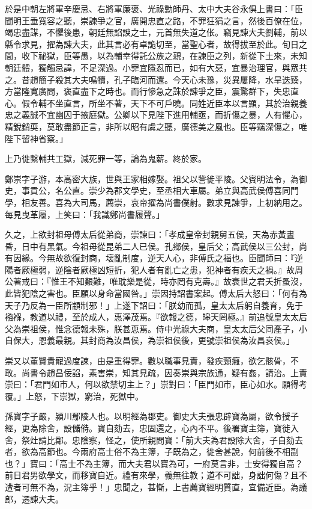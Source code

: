 \begin{pinyinscope}
於是中朝左將軍辛慶忌、右將軍廉褒、光祿勳師丹、太中大夫谷永俱上書曰：「臣聞明王垂寬容之聽，崇諫爭之官，廣開忠直之路，不罪狂狷之言，然後百僚在位，竭忠盡謀，不懼後患，朝廷無諂諛之士，元首無失道之伥。竊見諫大夫劉輔，前以縣令求見，擢為諫大夫，此其言必有卓詭切至，當聖心者，故得拔至於此。旬日之間，收下祕獄，臣等愚，以為輔幸得託公族之親，在諫臣之列，新從下土來，未知朝廷體，獨觸忌諱，不足深過。小罪宜隱忍而已，如有大惡，宜暴治理官，與眾共之。昔趙簡子殺其大夫鳴犢，孔子臨河而還。今天心未豫，災異屢降，水旱迭臻，方當隆寬廣問，褒直盡下之時也。而行慘急之誅於諫爭之臣，震驚群下，失忠直心。假令輔不坐直言，所坐不著，天下不可戶曉。同姓近臣本以言顯，其於治親養忠之義誠不宜幽囚于掖庭獄。公卿以下見陛下進用輔亟，而折傷之暴，人有懼心，精銳銷耎，莫敢盡節正言，非所以昭有虞之聽，廣德美之風也。臣等竊深傷之，唯陛下留神省察。」

上乃徙繫輔共工獄，減死罪一等，論為鬼薪。終於家。

鄭崇字子游，本高密大族，世與王家相嫁娶。祖父以訾徙平陵。父賓明法令，為御史，事貢公，名公直。崇少為郡文學史，至丞相大車屬。弟立與高武侯傅喜同門學，相友善。喜為大司馬，薦崇，哀帝擢為尚書僕射。數求見諫爭，上初納用之。每見曳革履，上笑曰：「我識鄭尚書履聲。」

久之，上欲封祖母傅太后從弟商，崇諫曰：「孝成皇帝封親舅五侯，天為赤黃晝昏，日中有黑氣。今祖母從昆弟二人已侯。孔鄉侯，皇后父；高武侯以三公封，尚有因緣。今無故欲復封商，壞亂制度，逆天人心，非傅氏之福也。臣聞師曰：『逆陽者厥極弱，逆陰者厥極凶短折，犯人者有亂亡之患，犯神者有疾夭之禍。』故周公著戒曰：『惟王不知艱難，唯耽樂是從，時亦罔有克壽。』故衰世之君夭折蚤沒，此皆犯陰之害也。臣願以身命當國咎。」崇因持詔書案起。傅太后大怒曰：「何有為天子乃反為一臣所顓制邪！」上遂下詔曰：「朕幼而孤，皇太太后躬自養育，免于襁褓，教道以禮，至於成人，惠澤茂焉。『欲報之德，皞天罔極。』前追號皇太太后父為崇祖侯，惟念德報未殊，朕甚恧焉。侍中光祿大夫商，皇太太后父同產子，小自保大，恩義最親。其封商為汝昌侯，為崇祖侯後，更號崇祖侯為汝昌哀侯。」

崇又以董賢貴寵過度諫，由是重得罪。數以職事見責，發疾頸癰，欲乞骸骨，不敢。尚書令趙昌佞諂，素害崇，知其見疏，因奏崇與宗族通，疑有姦，請治。上責崇曰：「君門如巿人，何以欲禁切主上？」崇對曰：「臣門如巿，臣心如水。願得考覆。」上怒，下崇獄，窮治，死獄中。

孫寶字子嚴，潁川鄢陵人也。以明經為郡吏。御史大夫張忠辟寶為屬，欲令授子經，更為除舍，設儲偫。寶自劾去，忠固還之，心內不平。後署寶主簿，寶徙入舍，祭灶請比鄰。忠陰察，怪之，使所親問寶：「前大夫為君設除大舍，子自劾去者，欲為高節也。今兩府高士俗不為主簿，子既為之，徙舍甚說，何前後不相副也？」寶曰：「高士不為主簿，而大夫君以寶為可，一府莫言非，士安得獨自高？前日君男欲學文，而移寶自近。禮有來學，義無往教；道不可詘，身詘何傷？且不遭者可無不為，況主簿乎！」忠聞之，甚慚，上書薦寶經明質直，宜備近臣。為議郎，遷諫大夫。


\end{pinyinscope}
